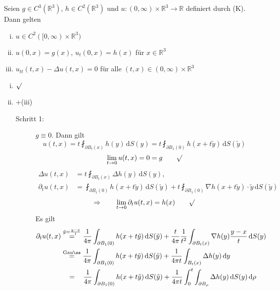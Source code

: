 \begin{satz}
	Seien $g \in C^3(\mathbb{R}^3)$, $h \in C^2(\mathbb{R}^3)$ und $u: (0,\infty) \times \mathbb{R}^3 \to \mathbb{R}$ definiert durch (K). Dann gelten
	\begin{enumerate}[(i)]
		\item $ u \in C^2([0, \infty) \times \mathbb{R}^3) $
		\item $u(0,x)=g(x)$, $u_t(0,x) =h(x)$ für $x \in \mathbb{R}^3$
		\item $u_{tt}(t,x)- \Delta u(t,x)=0$ für alle $(t,x) \in (0,\infty) \times \mathbb{R}^3$
	\end{enumerate}
\end{satz}
\begin{beweis}
	\begin{enumerate}[(i)]
		\item $\surd$ 
		\item +(iii) \begin{description}
			\item[Schritt 1:] $g \equiv 0$. Dann gilt
			\[
				u(t,x)= t \fint_{\partial B_t(x)}^{} h(y) \,\mathrm{d}S(y) = t \fint_{\partial B_1(0)}^{} h(x+t \tilde y) \,\mathrm{d}S( \tilde y)
			\] 
			\[
				\lim_{t \to 0} u(t,x) = 0 = g \qquad \surd
			\]
			\begin{align*}
				\Delta u(t,x) &= t \fint_{\partial B_t(x)}^{} \Delta h(y) \,\mathrm{d}S(y), \\
				\partial_t u(t,x) &= \fint_{\partial B_1(0)}^{} h(x+ t \tilde y) \,\mathrm{d}S( \tilde y) + t \fint_{\partial B_1(0)}^{}  \nabla h(x+t \tilde y)\cdot \tilde y \,\mathrm{d}S( \tilde y)
			\end{align*}
			\[
				\Rightarrow \qquad \lim_{t \to 0} \partial_t u(t,x) = h(x) \qquad \surd
			\]
		Es gilt
		\begin{align*}
			\partial_t u(t,x)& \stackrel{\tilde y = \frac{y-x}{t}}{=} \frac{1}{4 \pi} \int_{\partial B_1(0)}^{} h(x+t \tilde y) \,\mathrm{d}S( \tilde y) + 
			\frac{t}{4 \pi} \frac{1}{t^2} \int_{ \partial B_t(x)}^{}  \nabla  h(y) \frac{y-x}{t} \,\mathrm{d}S(y) \\
			&\stackrel{\text{Gauß}}{=} \frac{1}{4 \pi} \int_{\partial B_1(0)}^{} h(x+ t \tilde y) \,\mathrm{d}S( \tilde y) 
			+ \frac{1}{4 \pi t} \int_{B_t(x)}^{} \Delta h(y) \,\mathrm{d}y \\
			&\stackrel{\hphantom{Gauß}}{=} \frac{1}{4 \pi} \int_{ \partial B_1(0)}^{} h(x+t \tilde y) \,\mathrm{d}S( \tilde y) +
			\frac{1}{4 \pi t} \int_{0}^{t} \int_{\partial B_{\rho}}^{} \Delta h(y) \,\mathrm{d}S(y) \,\mathrm{d}\rho

\end{align*}
\end{description}
\end{enumerate}
\end{beweis}
